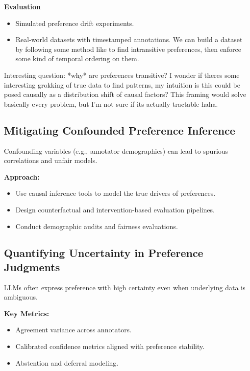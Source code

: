 \documentclass[sigconf]{acmart}
\begin{document}
\textbf{Evaluation}
\begin{itemize}
    \item Simulated preference drift experiments.
    \item Real-world datasets with timestamped annotations. We can build a dataset by following some method like \cite{non_transitivity_llm_evaluators_paper} to find intransitive preferences, then enforce some kind of temporal ordering on them. 
\end{itemize}

Interesting question: *why* are preferences transitive? I wonder if theres some interesting grokking of true data to find patterns, my intuition is this could be posed causally as a distribution shift of causal factors? This framing would solve basically every problem, but I'm not sure if its actually tractable haha. 


\subsection{Mitigating Confounded Preference Inference}

Confounding variables (e.g., annotator demographics) can lead to spurious correlations and unfair models.

\textbf{Approach:}
\begin{itemize}
    \item Use causal inference tools to model the true drivers of preferences.
    \item Design counterfactual and intervention-based evaluation pipelines.
    \item Conduct demographic audits and fairness evaluations.
\end{itemize}

\subsection{Quantifying Uncertainty in Preference Judgments}

LLMs often express preference with high certainty even when underlying data is ambiguous.

\textbf{Key Metrics:}
\begin{itemize}
    \item Agreement variance across annotators.
    \item Calibrated confidence metrics aligned with preference stability.
    \item Abstention and deferral modeling.
\end{itemize}
\end{document}

